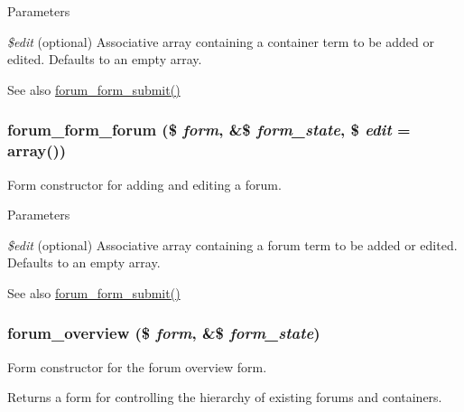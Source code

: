 \begin{DoxyParams}{Parameters}
\item[{\em \$edit}](optional) Associative array containing a container term to be added or edited. Defaults to an empty array.\end{DoxyParams}
\begin{DoxySeeAlso}{See also}
\hyperlink{forum_8admin_8inc_a517cd1e23374b0242a197a3c5250a0c9}{forum\_\-form\_\-submit()} 
\end{DoxySeeAlso}
\hypertarget{group__forms_ga74d0d5997a52e44a382cd6792b8718dc}{
\subsubsection[{forum\_\-form\_\-forum}]{\setlength{\rightskip}{0pt plus 5cm}forum\_\-form\_\-forum (\$ {\em form}, \/  \&\$ {\em form\_\-state}, \/  \$ {\em edit} = {\ttfamily array()})}}
\label{group__forms_ga74d0d5997a52e44a382cd6792b8718dc}
Form constructor for adding and editing a forum.


\begin{DoxyParams}{Parameters}
\item[{\em \$edit}](optional) Associative array containing a forum term to be added or edited. Defaults to an empty array.\end{DoxyParams}
\begin{DoxySeeAlso}{See also}
\hyperlink{forum_8admin_8inc_a517cd1e23374b0242a197a3c5250a0c9}{forum\_\-form\_\-submit()} 
\end{DoxySeeAlso}
\hypertarget{group__forms_ga889bd81421fcd1aa02d5fc45c5ff8256}{
\subsubsection[{forum\_\-overview}]{\setlength{\rightskip}{0pt plus 5cm}forum\_\-overview (\$ {\em form}, \/  \&\$ {\em form\_\-state})}}
\label{group__forms_ga889bd81421fcd1aa02d5fc45c5ff8256}
Form constructor for the forum overview form.

Returns a form for controlling the hierarchy of existing forums and containers.

